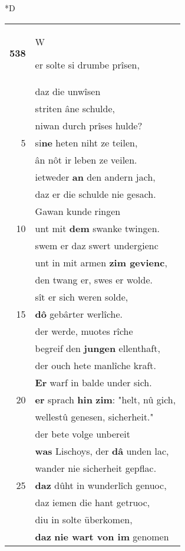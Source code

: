 \documentclass[8pt,a4paper,notitlepage]{article}
\begin{document}
\begin{table}[ht]
\begin{minipage}[t]{0.5\linewidth}
\small
\begin{center}*D
\end{center}
\begin{tabular}{rl}
\textbf{538} & \begin{large}W\end{large}er solte si drumbe prîsen,\\ 
 & daz die unwîsen\\ 
 & striten âne schulde,\\ 
 & niwan durch prîses hulde?\\ 
5 & si\textbf{ne} heten niht ze teilen,\\ 
 & ân nôt ir leben ze veilen.\\ 
 & ietweder \textbf{an} den andern jach,\\ 
 & daz er die schulde nie gesach.\\ 
 & Gawan kunde ringen\\ 
10 & unt mit \textbf{dem} swanke twingen.\\ 
 & swem er daz swert undergienc\\ 
 & unt in mit armen \textbf{zim gevienc},\\ 
 & den twang er, swes er wolde.\\ 
 & sît er sich weren solde,\\ 
15 & \textbf{dô} gebârter werlîche.\\ 
 & der werde, muotes rîche\\ 
 & begreif den \textbf{jungen} ellenthaft,\\ 
 & der ouch hete manlîche kraft.\\ 
 & \textbf{Er} warf in balde under sich.\\ 
20 & \textbf{er} sprach \textbf{hin} \textbf{zim}: "helt, nû gich,\\ 
 & wellestû genesen, sicherheit."\\ 
 & der bete volge unbereit\\ 
 & \textbf{was} Lischoys, der \textbf{dâ} unden lac,\\ 
 & wander nie sicherheit gepflac.\\ 
25 & \textbf{daz} dûht in wunderlîch genuoc,\\ 
 & daz iemen die hant getruoc,\\ 
 & diu in solte überkomen,\\ 
 & \textbf{daz} \textbf{nie wart von im} genomen\\ 

\end{tabular}
\end{minipage}
\end{table}
\end{document}
